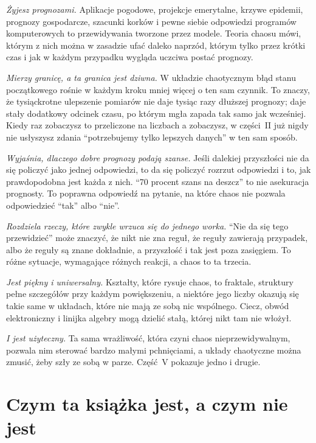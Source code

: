 \emph{Żyjesz prognozami.} Aplikacje pogodowe, projekcje emerytalne, krzywe
epidemii, prognozy gospodarcze, szacunki korków i pewne siebie odpowiedzi
programów komputerowych to przewidywania tworzone przez modele. Teoria chaosu
mówi, którym z nich można w zasadzie ufać daleko naprzód, którym tylko przez
krótki czas i jak w każdym przypadku wygląda uczciwa postać prognozy.

\emph{Mierzy granicę, a ta granica jest dziwna.} W układzie chaotycznym błąd
stanu początkowego rośnie w każdym kroku mniej więcej o ten sam czynnik. To
znaczy, że tysiąckrotne ulepszenie pomiarów nie daje tysiąc razy dłuższej
prognozy; daje stały dodatkowy odcinek czasu, po którym mgła zapada tak samo
jak wcześniej. Kiedy raz zobaczysz to przeliczone na liczbach \dash{} a
zobaczysz, w części~II \dash{} już nigdy nie usłyszysz zdania
\enquote{potrzebujemy tylko lepszych danych} w ten sam sposób.

\emph{Wyjaśnia, dlaczego dobre prognozy podają szanse.} Jeśli dalekiej
przyszłości nie da się policzyć jako jednej odpowiedzi, to da się policzyć
rozrzut odpowiedzi i to, jak prawdopodobna jest każda z nich.
\enquote{70 procent szans na deszcz} to nie asekuracja prognosty. To
poprawna odpowiedź na pytanie, na które chaos nie pozwala odpowiedzieć
\enquote{tak} albo \enquote{nie}.

\emph{Rozdziela rzeczy, które zwykle wrzuca się do jednego worka.}
\enquote{Nie da się tego przewidzieć} może znaczyć, że nikt nie zna reguł,
że reguły zawierają przypadek, albo że reguły są znane dokładnie, a
przyszłość i tak jest poza zasięgiem. To różne sytuacje, wymagające różnych
reakcji, a chaos to ta trzecia.

\emph{Jest piękny i uniwersalny.} Kształty, które rysuje chaos, to fraktale,
struktury pełne szczegółów przy każdym powiększeniu, a niektóre jego liczby
okazują się takie same w układach, które nie mają ze sobą nic wspólnego.
Ciecz, obwód elektroniczny i linijka algebry mogą dzielić stałą, której nikt
tam nie włożył.

\emph{I jest użyteczny.} Ta sama wrażliwość, która czyni chaos
nieprzewidywalnym, pozwala nim sterować bardzo małymi pchnięciami, a układy
chaotyczne można zmusić, żeby szły ze sobą w parze. Część~V pokazuje jedno
i drugie.

\section*{Czym ta książka jest, a czym nie jest}

